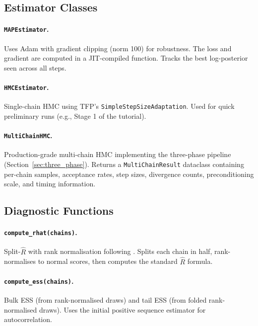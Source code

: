 \documentclass[11pt,a4paper]{article}
\theoremstyle{definition}
\newcommand{\code}[1]{\texttt{\color{codecolor}#1}}
\begin{document}
	\subsection{Estimator Classes}
	\label{app:dsgeEZ_estimators}
	
	\paragraph{\code{MAPEstimator}.}
	Uses Adam with gradient clipping (norm 100) for robustness.
	The loss and gradient are computed in a JIT-compiled function.
	Tracks the best log-posterior seen across all steps.
	
	\paragraph{\code{HMCEstimator}.}
	Single-chain HMC using TFP's \code{SimpleStepSizeAdaptation}.
	Used for quick preliminary runs (e.g., Stage 1 of the tutorial).
	
	\paragraph{\code{MultiChainHMC}.}
	Production-grade multi-chain HMC implementing the three-phase pipeline (Section~\ref{sec:three_phase}).
	Returns a \code{MultiChainResult} dataclass containing per-chain samples, acceptance rates, step sizes, divergence counts, preconditioning scale, and timing information.
	
	\subsection{Diagnostic Functions}
	\label{app:dsgeEZ_diag}
	
	\paragraph{\code{compute\_rhat(chains)}.}
	Split-$\hat{R}$ with rank normalisation following \citet{vehtari2021rank}.
	Splits each chain in half, rank-normalises to normal scores, then computes the standard $\hat{R}$ formula.
	
	\paragraph{\code{compute\_ess(chains)}.}
	Bulk ESS (from rank-normalised draws) and tail ESS (from folded rank-normalised draws).
	Uses the initial positive sequence estimator for autocorrelation.
	
\end{document}
